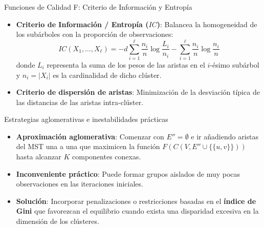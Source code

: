 \documentclass[
  ignorenonframetext,
]{beamer}
\providecommand{\tightlist}{%
  \setlength{\itemsep}{0pt}\setlength{\parskip}{0pt}}
\begin{document}
\begin{frame}{Funciones de Calidad F: Criterio de Información y
Entropía}
\label{funciones-de-calidad-f-criterio-de-informaciuxf3n-y-entropuxeda}
\begin{itemize}
\item
  \textbf{Criterio de Información / Entropía (\(IC\))}: Balancea la
  homogeneidad de los subárboles con la proporción de observaciones: \[
  IC(X_1, \dots, X_\ell) = -d \sum_{i=1}^\ell \frac{n_i}{n} \log \frac{L_i}{n_i} - \sum_{i=1}^\ell \frac{n_i}{n} \log \frac{n_i}{n}
  \] donde \(L_i\) representa la suma de los pesos de las aristas en el
  \(i\)-ésimo subárbol y \(n_i = |X_i|\) es la cardinalidad de dicho
  clúster.
\item
  \textbf{Criterio de dispersión de aristas}: Minimización de la
  desviación típica de las distancias de las aristas intra-clúster.
\end{itemize}
\end{frame}

\begin{frame}{Estrategias aglomerativas e inestabilidades prácticas}
\label{estrategias-aglomerativas-e-inestabilidades-pruxe1cticas}
\begin{tcolorbox}[enhanced jigsaw, left=2mm, opacityback=0, titlerule=0mm, breakable, toptitle=1mm, rightrule=.15mm, bottomtitle=1mm, coltitle=black, title=\textcolor{quarto-callout-warning-color}{\faExclamationTriangle}\hspace{0.5em}{Estrategia aglomerativa y corrección de inestabilidad}, colframe=quarto-callout-warning-color-frame, colbacktitle=quarto-callout-warning-color!10!white, arc=.35mm, toprule=.15mm, leftrule=.75mm, bottomrule=.15mm, opacitybacktitle=0.6, colback=white]

\begin{itemize}
\tightlist
\item
  \textbf{Aproximación aglomerativa}: Comenzar con \(E'' = \emptyset\) e
  ir añadiendo aristas del MST una a una que maximicen la función
  \(F(C(V, E'' \cup \{\{u,v\}\}))\) hasta alcanzar \(K\) componentes
  conexas.
\item
  \textbf{Inconveniente práctico}: Puede formar grupos aislados de muy
  pocas observaciones en las iteraciones iniciales.
\item
  \textbf{Solución}: Incorporar penalizaciones o restricciones basadas
  en el \textbf{índice de Gini} que favorezcan el equilibrio cuando
  exista una disparidad excesiva en la dimensión de los clústeres.
\end{itemize}

\end{tcolorbox}
\end{frame}
\end{document}

